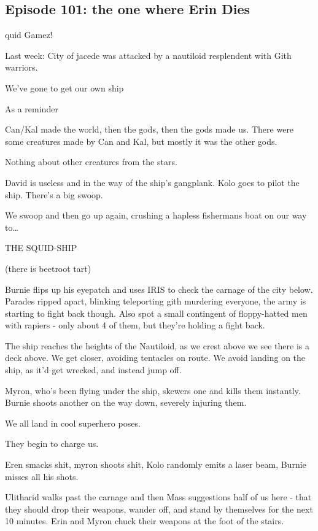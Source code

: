 \subsection{Episode 101: the one where Erin Dies}

quid Gamez!\medskip

Last week: City of jacede was attacked by a nautiloid resplendent with Gith warriors.\medskip

We’ve gone to get our own ship\medskip

As a reminder\medskip

Can/Kal made the world, then the gods, then the gods made us. There were some creatures made by Can and Kal, but mostly it was the other gods.\medskip

Nothing about other creatures from the stars.\medskip

David is useless and in the way of the ship’s gangplank. Kolo goes to pilot the ship. There’s a big swoop.\medskip

We swoop and then go up again, crushing a hapless fishermans boat on our way to…\medskip

THE SQUID-SHIP\medskip

(there is beetroot tart)\medskip

Burnie flips up his eyepatch and uses IRIS to check the carnage of the city below. Parades ripped apart, blinking teleporting gith murdering everyone, the army is starting to fight back though. Also spot a small contingent of floppy-hatted men with rapiers - only about 4 of them, but they’re holding a fight back.\medskip

The ship reaches the heights of the Nautiloid, as we crest above we see there is a deck above. We get closer, avoiding tentacles on route. We avoid landing on the ship, as it’d get wrecked, and instead jump off.\medskip

Myron, who’s been flying under the ship, skewers one and kills them instantly. Burnie shoots another on the way down, severely injuring them.\medskip

We all land in cool superhero poses.\medskip

They begin to charge us.\medskip

Eren smacks shit, myron shoots shit, Kolo randomly emits a laser beam, Burnie misses all his shots.\medskip

Ulitharid walks past the carnage and then Mass suggestions half of us here - that they should drop their weapons, wander off, and stand by themselves for the next 10 minutes. Erin and Myron chuck their weapons at the foot of the stairs.\medskip

